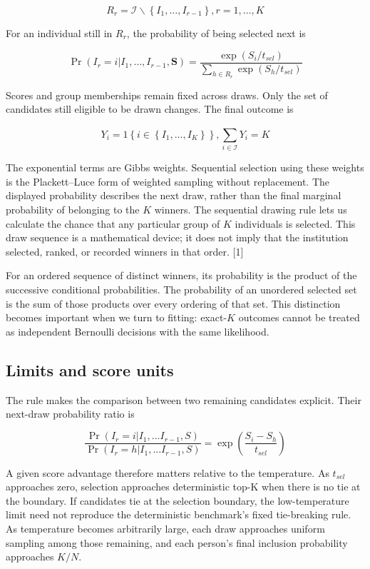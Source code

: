 \[
R_{r} = \mathcal{I} \smallsetminus \left\{ I_{1},\ldots,I_{r - 1} \right\},r = 1,\ldots,K
\]

For an individual still in \(R_{r}\), the probability of being selected next is

\[
\Pr\left( I_{r} = i|I_{1},\ldots,I_{r - 1},\mathbf{S} \right) = \frac{\exp\left( S_{i}/t_{sel} \right)}{\sum_{h \in R_{r}}^{}{\exp\left( S_{h}/t_{sel} \right)}}
\]

Scores and group memberships remain fixed across draws. Only the set of candidates still eligible to be drawn changes. The final outcome is

\[
Y_{i} = 1\left\{ i \in \left\{ I_{1},\ldots,I_{K} \right\} \right\},\sum_{i \in \mathcal{I}}^{}Y_{i} = K
\]

The exponential terms are Gibbs weights. Sequential selection using these weights is the Plackett--Luce form of weighted sampling without replacement. The displayed probability describes the next draw, rather than the final marginal probability of belonging to the \(K\) winners. The sequential drawing rule lets us calculate the chance that any particular group of \(K\) individuals is selected. This draw sequence is a mathematical device; it does not imply that the institution selected, ranked, or recorded winners in that order. {[}1{]}

For an ordered sequence of distinct winners, its probability is the product of the successive conditional probabilities. The probability of an unordered selected set is the sum of those products over every ordering of that set. This distinction becomes important when we turn to fitting: exact-\(K\) outcomes cannot be treated as independent Bernoulli decisions with the same likelihood.

\subsection{Limits and score units}\label{limits-and-score-units}

The rule makes the comparison between two remaining candidates explicit. Their next-draw probability ratio is

\[
\frac{\Pr\left(  I_{r} = i| I_{1},...I_{r-1},S \right)}{\Pr\left(  I_{r} = h| I_{1},...I_{r-1},S \right)} = \exp\left( \frac{S_{i} - S_{h}}{t_{sel}} \right)
\]

A given score advantage therefore matters relative to the temperature. As \(t_{sel}\) approaches zero, selection approaches deterministic top-K when there is no tie at the boundary. If candidates tie at the selection boundary, the low-temperature limit need not reproduce the deterministic benchmark's fixed tie-breaking rule. As temperature becomes arbitrarily large, each draw approaches uniform sampling among those remaining, and each person's final inclusion probability approaches \(K/N\).

